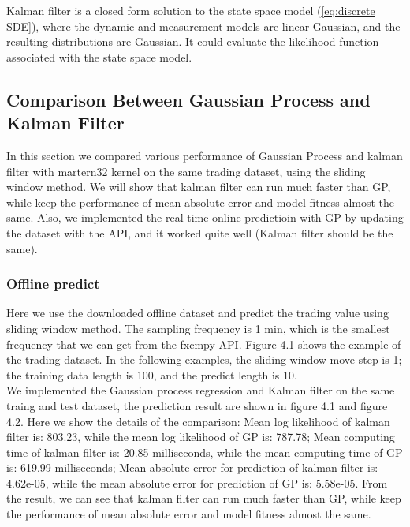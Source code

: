 \documentclass[12pt]{article}
\begin{document}
Kalman filter \cite{kalman:1960:kalmanfilter} is a closed form solution to the state space model (\ref{eq:discrete SDE}), where the dynamic and measurement models are linear Gaussian, and the resulting distributions are Gaussian. It could evaluate the likelihood function associated with the state
space model.\\


\subsection{Comparison Between Gaussian Process and Kalman Filter}
In this section we compared various performance of Gaussian Process and kalman filter with martern32 kernel on the same trading dataset, using the sliding window method. We will show that kalman filter can run much faster than GP, while keep the performance of mean absolute error and model fitness almost the same. Also, we implemented the real-time online predictioin with GP by updating the dataset with the API, and it worked quite well (Kalman filter should be the same).

\subsubsection{Offline predict}
Here we use the downloaded offline dataset and predict the trading value using sliding window method. The sampling frequency is 1 min, which is the smallest frequency that we can get from the fxcmpy API. Figure 4.1 shows the example of the trading dataset. In the following examples, the sliding window move step is 1; the training data length is 100, and the predict length is 10.\\

We implemented the Gaussian process regression and Kalman filter on the same traing and test dataset, the prediction result are shown in figure 4.1 and figure 4.2. Here we show the details of the comparison: Mean log likelihood of kalman filter is: 803.23, while the mean log likelihood of GP is: 787.78; Mean computing time of kalman filter is: 20.85 milliseconds, while the mean computing time of GP is: 619.99 milliseconds; Mean absolute error for prediction of kalman filter is: 4.62e-05, while the mean absolute error for prediction of GP is: 5.58e-05. From the result, we can see that kalman filter can run much faster than GP, while keep the performance of mean absolute error and model fitness almost the same. 
\end{document}
